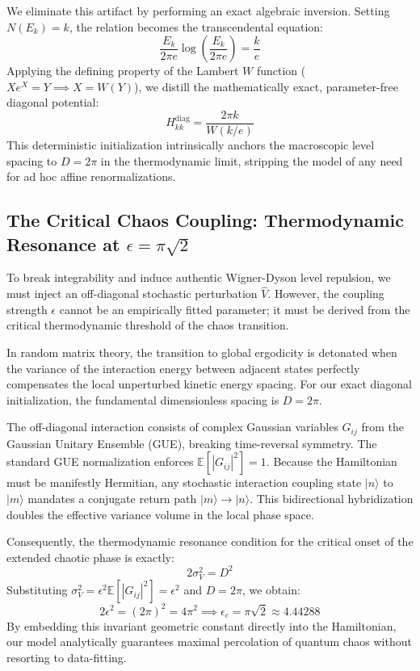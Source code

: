 \documentclass[prl,aps,floatfix,superscriptaddress,10pt]{revtex4-2}
\begin{document}
We eliminate this artifact by performing an exact algebraic inversion. Setting $N(E_k) = k$, the relation becomes the transcendental equation:
\begin{equation}
\frac{E_k}{2\pi e} \log\left(\frac{E_k}{2\pi e}\right) = \frac{k}{e}
\end{equation}
Applying the defining property of the Lambert $W$ function ($X e^X = Y \implies X = W(Y)$), we distill the mathematically exact, parameter-free diagonal potential:
\begin{equation}
\boxed{ H_{kk}^{\text{diag}} = \frac{2\pi k}{W(k/e)} }
\end{equation}
This deterministic initialization intrinsically anchors the macroscopic level spacing to $D = 2\pi$ in the thermodynamic limit, stripping the model of any need for ad hoc affine renormalizations.

\subsection{The Critical Chaos Coupling: Thermodynamic Resonance at \texorpdfstring{$\epsilon = \pi \sqrt{2}$}{epsilon = pi sqrt(2)}}

To break integrability and induce authentic Wigner-Dyson level repulsion, we must inject an off-diagonal stochastic perturbation $\hat{V}$. However, the coupling strength $\epsilon$ cannot be an empirically fitted parameter; it must be derived from the critical thermodynamic threshold of the chaos transition.

In random matrix theory, the transition to global ergodicity is detonated when the variance of the interaction energy between adjacent states perfectly compensates the local unperturbed kinetic energy spacing. For our exact diagonal initialization, the fundamental dimensionless spacing is $D = 2\pi$.

The off-diagonal interaction consists of complex Gaussian variables $G_{ij}$ from the Gaussian Unitary Ensemble (GUE), breaking time-reversal symmetry. The standard GUE normalization enforces $\mathbb{E}[|G_{ij}|^2] = 1$. Because the Hamiltonian must be manifestly Hermitian, any stochastic interaction coupling state $|n\rangle$ to $|m\rangle$ mandates a conjugate return path $|m\rangle \to |n\rangle$. This bidirectional hybridization doubles the effective variance volume in the local phase space. 

Consequently, the thermodynamic resonance condition for the critical onset of the extended chaotic phase is exactly:
\begin{equation}
2 \sigma_V^2 = D^2
\end{equation}
Substituting $\sigma_V^2 = \epsilon^2 \mathbb{E}[|G_{ij}|^2] = \epsilon^2$ and $D = 2\pi$, we obtain:
\begin{equation}
2 \epsilon^2 = (2\pi)^2 = 4\pi^2 \implies \boxed{ \epsilon_c = \pi \sqrt{2} \approx 4.44288 }
\end{equation}
By embedding this invariant geometric constant directly into the Hamiltonian, our model analytically guarantees maximal percolation of quantum chaos without resorting to data-fitting.
\end{document}
